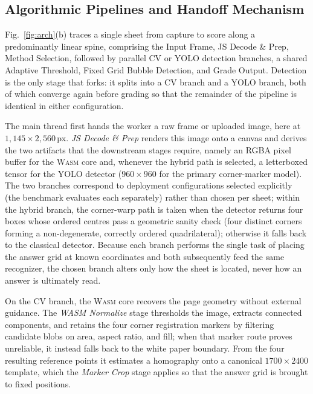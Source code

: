 \documentclass[conference]{IEEEtran}
\newcommand{\wasm}{\textnormal{\textsc{Wasm}}}
\begin{document}
\subsection{Algorithmic Pipelines and Handoff Mechanism}

Fig.~\ref{fig:arch}(b) traces a single sheet from capture to score along
a predominantly linear spine, comprising the Input Frame, JS Decode \&
Prep, Method Selection, followed by parallel CV or YOLO detection branches, a shared Adaptive Threshold, Fixed Grid Bubble Detection, and
Grade Output. Detection is the only stage that forks: it splits into a CV
branch and a YOLO branch, both of which converge again before grading so
that the remainder of the pipeline is identical in either configuration.

The main thread first hands the worker a raw frame or uploaded image,
here at $1{,}145\times2{,}560$\,px. \emph{JS Decode \& Prep} renders this
image onto a canvas and derives the two artifacts that the downstream
stages require, namely an RGBA pixel buffer for the \wasm{} core and,
whenever the hybrid path is selected, a letterboxed tensor for the YOLO
detector ($960\times960$ for the primary corner-marker model).
The two branches correspond to deployment configurations selected explicitly
(the benchmark evaluates each separately) rather than chosen per sheet; within
the hybrid branch, the corner-warp path is taken when the detector returns four
boxes whose ordered centres pass a geometric sanity check (four distinct corners
forming a non-degenerate, correctly ordered quadrilateral); otherwise it falls
back to the classical detector. Because each branch performs the single task of
placing the answer grid at known coordinates and both subsequently feed
the same recognizer, the chosen branch alters only how the sheet is
located, never how an answer is ultimately read.

On the CV branch, the \wasm{} core recovers the page geometry without
external guidance. The \emph{WASM Normalize} stage thresholds the image,
extracts connected components, and retains the four corner registration
markers by filtering candidate blobs on area, aspect ratio, and fill;
when that marker route proves unreliable, it instead falls back to the
white paper boundary. From the four resulting reference points it
estimates a homography onto a canonical $1700\times2400$ template, which
the \emph{Marker Crop} stage applies so that the answer grid is brought
to fixed positions.
\end{document}
